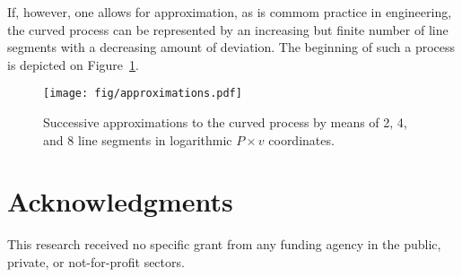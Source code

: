 \documentclass[fleqn,10pt]{SelfArx}
\begin{document}
    If, however, one allows for approximation, as is commom practice in engineering, the  curved
    process can be represented by an increasing but  finite  number  of  line  segments  with  a
    decreasing amount of deviation. The beginning of such a process is depicted on
    Figure~\ref{fig:approx}.

    \begin{figure}[ht]
        \centering
        \texttt{[image: fig/approximations.pdf]}
        \caption{Successive approximations to the curved process by means of 2, 4,  and  8  line
            segments in logarithmic $P\times v$ coordinates.}
        \label{fig:approx}
    \end{figure}

\section*{Acknowledgments}

    This research received no specific grant from any funding agency in the public, private,  or
    not-for-profit sectors.





\end{document}
